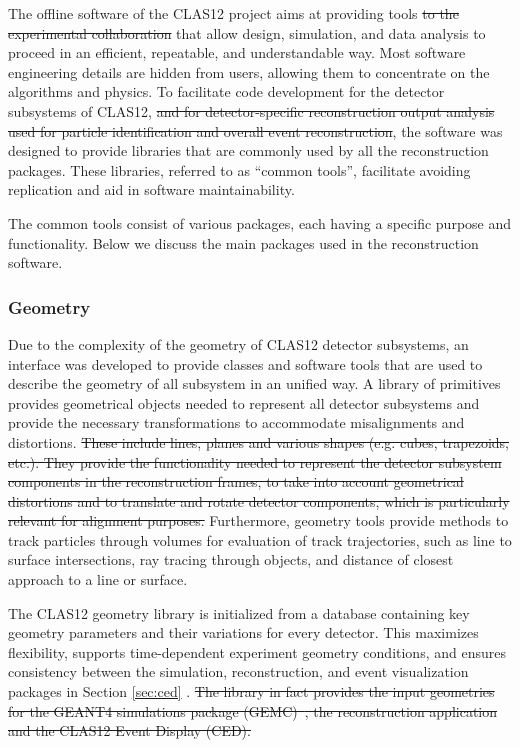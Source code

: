 The offline software of the CLAS12 project aims at providing tools \sout{to the experimental collaboration} that allow design, simulation, and data analysis to proceed in an efficient, repeatable, and understandable way. Most  software engineering details are hidden from users, allowing them to concentrate on the algorithms and physics.  To facilitate code development for the detector subsystems of CLAS12, \sout{and for detector-specific reconstruction output analysis used for particle identification and overall event reconstruction}, the software was designed to provide libraries that are commonly used by all the reconstruction packages.  These libraries, referred to as ``common tools'', facilitate avoiding replication and aid in software maintainability.

The common tools consist of various packages, each having a specific purpose and functionality. Below we discuss
the main packages used in the reconstruction software.

\subsubsection{Geometry}

Due to the complexity of the geometry of CLAS12 detector subsystems, an interface was developed to provide classes and software tools that are used to describe the geometry of all subsystem in an unified way.  A library of primitives provides geometrical objects needed to represent all detector subsystems and provide the necessary transformations to accommodate misalignments and distortions.  \sout{These include lines, planes and various shapes (e.g. cubes, trapezoids, etc.).  They provide the functionality needed to represent the detector subsystem components in the reconstruction frames, to take into account geometrical distortions and to translate and rotate detector components, which is particularly relevant for alignment purposes.}  Furthermore, geometry tools provide methods to track particles through volumes for evaluation of track trajectories, such as line to surface intersections, ray tracing through objects, and distance of closest approach to a line or surface.

The CLAS12 geometry library is initialized from a database containing key geometry parameters and their variations for every detector.  This maximizes flexibility, supports time-dependent experiment geometry conditions, and ensures consistency between the simulation, reconstruction, and event visualization packages in Section \ref{sec:ced} \cite{sim-nim}. \sout{The library in fact provides the input geometries for the GEANT4 simulations package (GEMC)~\cite{sim-nim}, the reconstruction application and the CLAS12 Event Display (CED).}

